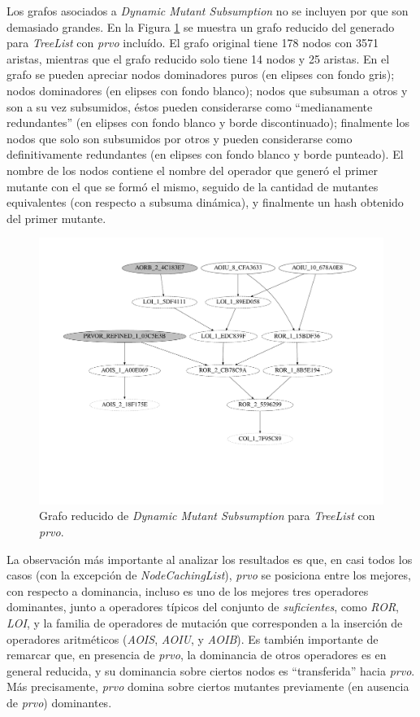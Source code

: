Los grafos asociados a \emph{Dynamic Mutant Subsumption} no se incluyen por que son demasiado grandes. En la Figura \ref{figures.examples.subsumption.reducedTreeListGraph} se muestra un grafo reducido del generado para \emph{TreeList} con \emph{prvo} inclu\'ido. El grafo original tiene 178 nodos con 3571 aristas, mientras que el grafo reducido solo tiene 14 nodos y 25 aristas. En el grafo se pueden apreciar nodos dominadores puros (en elipses con fondo gris); nodos dominadores (en elipses con fondo blanco); nodos que subsuman a otros y son a su vez subsumidos, \'estos pueden considerarse como ``medianamente redundantes'' (en elipses con fondo blanco y borde discontinuado); finalmente los nodos que solo son subsumidos por otros y pueden considerarse como definitivamente redundantes (en elipses con fondo blanco y borde punteado). El nombre de los nodos contiene el nombre del operador que gener\'o el primer mutante con el que se form\'o el mismo, seguido de la cantidad de mutantes equivalentes (con respecto a subsuma din\'amica), y finalmente un hash obtenido del primer mutante.

\begin{figure}
	\includegraphics[width=\linewidth]{figures/subsumption/dsg_apache_prvo_segment.pdf}
	\caption{Grafo reducido de \emph{Dynamic Mutant Subsumption} para \emph{TreeList} con \emph{prvo}.}
	\label{figures.examples.subsumption.reducedTreeListGraph}
\end{figure}

La observaci\'on m\'as importante al analizar los resultados es que, en casi todos los casos (con la excepci\'on de \emph{NodeCachingList}), \emph{prvo} se posiciona entre los mejores, con respecto a dominancia, incluso es uno de los mejores tres operadores dominantes, junto a operadores t\'ipicos del conjunto de \emph{suficientes}, como \emph{ROR}, \emph{LOI}, y la familia de operadores de mutaci\'on que corresponden a la inserci\'on de operadores aritm\'eticos (\emph{AOIS}, \emph{AOIU}, y \emph{AOIB}). Es tambi\'en importante de remarcar que, en presencia de \emph{prvo}, la dominancia de otros operadores es en general reducida, y su dominancia sobre ciertos nodos es ``transferida'' hacia \emph{prvo}. M\'as precisamente, \emph{prvo} domina sobre ciertos mutantes previamente (en ausencia de \emph{prvo}) dominantes.

